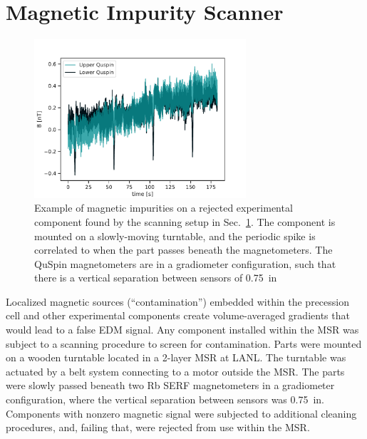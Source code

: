 
\section{Magnetic Impurity Scanner}\label{sec:magnetic_impurity_scanner}


\begin{figure}
    \centering
    \includegraphics[width=0.7\textwidth]{figures/magnetic_contamination_example.pdf}
    \caption
      {Example of magnetic impurities on a rejected experimental component found by the scanning setup in Sec.~\ref{sec:magnetic_impurity_scanner}. The component is mounted on a slowly-moving turntable, and the periodic spike is correlated to when the part passes beneath the magnetometers. The QuSpin magnetometers are in a gradiometer configuration, such that there is a vertical separation between sensors of \qty{0.75}{in}}
    \label{fig:magnetic_contamination_example}
\end{figure}

Localized magnetic sources (``contamination'') embedded within the precession cell and other experimental components create volume-averaged gradients that would lead to a false EDM signal. Any component installed within the MSR was subject to a scanning procedure to screen for contamination. Parts were mounted on a wooden turntable located in a 2-layer MSR at LANL. The turntable was actuated by a belt system connecting to a motor outside the MSR. The parts were slowly passed beneath two Rb SERF magnetometers in a gradiometer configuration, where the vertical separation between sensors was \qty{0.75}{in}. Components with nonzero magnetic signal were subjected to additional cleaning procedures, and, failing that, were rejected from use within the MSR.

